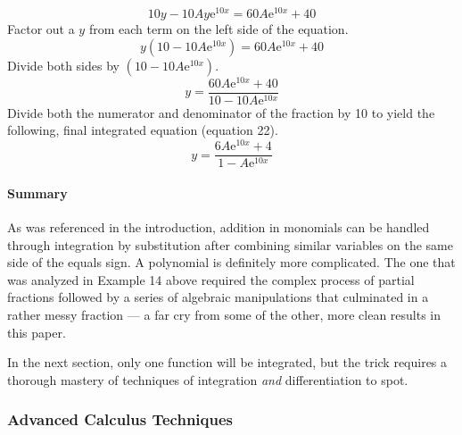 \documentclass{article}
\begin{document}
\begin{equation*}
    10y-10Ay\text{e}^{10x}=60A\text{e}^{10x}+40
\end{equation*}
Factor out a $y$ from each term on the left side of the equation.
\begin{equation*}
    y\left(10-10A\text{e}^{10x}\right)=60A\text{e}^{10x}+40
\end{equation*}
Divide both sides by $\left(10-10A\text{e}^{10x}\right)$.
\begin{equation*}
    y=\frac{60A\text{e}^{10x}+40}{10-10A\text{e}^{10x}}
\end{equation*}
Divide both the numerator and denominator of the fraction by 10 to yield the following, final integrated equation (equation 22).
\setcounter{equation}{21}
\begin{equation}
    y=\frac{6A\text{e}^{10x}+4}{1-A\text{e}^{10x}}
\end{equation}
\paragraph{Summary} As was referenced in the introduction, addition in monomials can be handled through integration by substitution after combining similar variables on the same side of the equals sign. A polynomial is definitely more complicated. The one that was analyzed in Example 14 above required the complex process of partial fractions followed by a series of algebraic manipulations that culminated in a rather messy fraction --- a far cry from some of the other, more clean results in this paper.\par
In the next section, only one function will be integrated, but the trick requires a thorough mastery of techniques of integration \emph{and} differentiation to spot.
\newpage

\subsubsection{Advanced Calculus Techniques}
\end{document}
